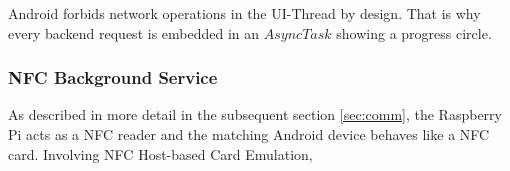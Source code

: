 Android forbids network operations in the UI-Thread by design. That is why every backend request is embedded in an $AsyncTask$ showing a progress circle.

\subsubsection{NFC Background Service}
As described in more detail in the subsequent section \ref{sec:comm}, the Raspberry Pi acts as a NFC reader and the matching Android device behaves like a NFC card.
Involving NFC Host-based Card Emulation,  